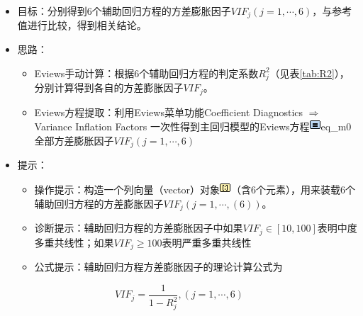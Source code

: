 \documentclass[12pt,(landscape,a4paper),(portrait,a4paper)]{article}
\providecommand{\tightlist}{%
  \setlength{\itemsep}{0pt}\setlength{\parskip}{0pt}}
\begin{document}
\begin{itemize}
\tightlist
\item
  目标：分别得到6个辅助回归方程的方差膨胀因子\(VIF_j(j=1,\cdots,6)\)，与参考值进行比较，得到相关结论。\\
\item
  思路：

  \begin{itemize}
  \tightlist
  \item
    Eviews手动计算：根据6个辅助回归方程的判定系数\(R^2_j\)（见表\ref{tab:R2}），分别计算得到各自的方差膨胀因子\(VIF_j\)。
  \item
    Eviews方程提取：利用Eviews菜单功能Coefficient Diagnostics
    \(\Rightarrow\) Variance Inflation Factors
    一次性得到主回归模型的Eviews方程\includegraphics{picture/object/Equation.png}eq\_m0全部方差膨胀因子\(VIF_j(j=1,\cdots,6)\)\\
  \end{itemize}
\item
  提示：

  \begin{itemize}
  \tightlist
  \item
    操作提示：构造一个列向量（vector）对象\includegraphics{picture/object/Vector.png}（含6个元素），用来装载6个辅助回归方程的方差膨胀因子\(VIF_j(j=1,\cdots,(6))\)。\\
  \item
    诊断提示：辅助回归方程的方差膨胀因子中如果\(VIF_j\in[10,100]\)表明中度多重共线性；如果\(VIF_j\geq{100}\)表明严重多重共线性
  \item
    公式提示：辅助回归方程方差膨胀因子的理论计算公式为
  \end{itemize}
\end{itemize}

\begin{equation}
VIF_j=\frac{1}{1-R^2_j},(j=1,\cdots,6) 
\label{eq:VIF}
\end{equation}
\end{document}
